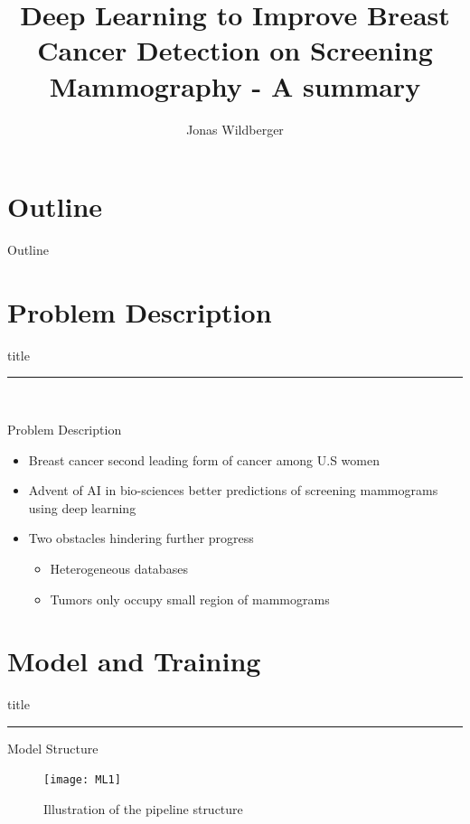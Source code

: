 \documentclass{beamer}
\title{ Deep Learning to Improve Breast Cancer Detection on Screening Mammography - A summary}
\author{Jonas Wildberger}
\institute{University of Oxford}
\date{} %
\begin{document}
{ 
\frame{\titlepage}}

\section*{Outline}\begin{frame}{Outline}\tableofcontents\end{frame}

\section{Problem Description}
    \begin{frame}[plain]
        \vfill
      \centering
      \begin{beamercolorbox}[sep=8pt,center,shadow=true,rounded=true]{title}
        \insertsectionhead\par%
        \color{oxfordblue}\noindent\rule{10cm}{1pt} \\
       
      \end{beamercolorbox}
      \vfill
  \end{frame}


\begin{frame}{Problem Description}
\begin{itemize}
	\item<1-> Breast cancer second leading form of cancer among U.S women
	
	\item<2-> Advent of AI in bio-sciences better predictions of screening mammograms using deep learning 
	\item<3-> Two obstacles hindering further progress
	\begin{itemize}
		\item<3-> Heterogeneous databases
		\item<3-> Tumors only occupy small region of mammograms
	\end{itemize}
	 
\end{itemize}

\end{frame}
\section{Model and Training}
\begin{frame}[plain]
\vfill
\centering
\begin{beamercolorbox}[sep=8pt,center,shadow=true,rounded=true]{title}
	\insertsectionhead\par%
	\color{oxfordblue}\noindent\rule{10cm}{1pt} 
	
\end{beamercolorbox}
\vfill
\end{frame}
\begin{frame}{Model Structure}
	\begin{figure}
	
	\centering
	\texttt{[image: ML1]}
	\caption{Illustration of the pipeline structure \cite{article}}
\end{figure}
\end{frame}
\end{document}
